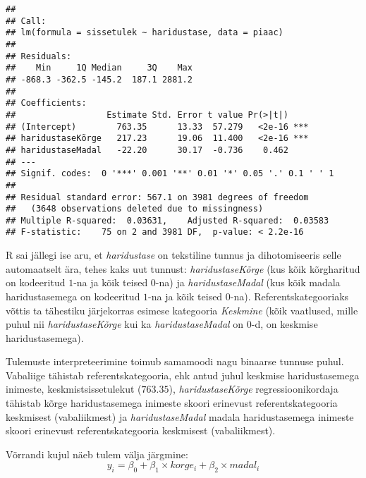 \documentclass[
]{book}
\begin{document}
\begin{verbatim}
## 
## Call:
## lm(formula = sissetulek ~ haridustase, data = piaac)
## 
## Residuals:
##    Min     1Q Median     3Q    Max 
## -868.3 -362.5 -145.2  187.1 2881.2 
## 
## Coefficients:
##                  Estimate Std. Error t value Pr(>|t|)    
## (Intercept)        763.35      13.33  57.279   <2e-16 ***
## haridustaseKõrge   217.23      19.06  11.400   <2e-16 ***
## haridustaseMadal   -22.20      30.17  -0.736    0.462    
## ---
## Signif. codes:  0 '***' 0.001 '**' 0.01 '*' 0.05 '.' 0.1 ' ' 1
## 
## Residual standard error: 567.1 on 3981 degrees of freedom
##   (3648 observations deleted due to missingness)
## Multiple R-squared:  0.03631,    Adjusted R-squared:  0.03583 
## F-statistic:    75 on 2 and 3981 DF,  p-value: < 2.2e-16
\end{verbatim}

R sai jällegi ise aru, et \emph{haridustase} on tekstiline tunnus ja dihotomiseeris selle automaatselt ära, tehes kaks uut tunnust: \emph{haridustaseKõrge} (kus kõik kõrgharitud on kodeeritud \(1\)-na ja kõik teised \(0\)-na) ja \emph{haridustaseMadal} (kus kõik madala haridustasemega on kodeeritud \(1\)-na ja kõik teised \(0\)-na). Referentskategooriaks võttis ta tähestiku järjekorras esimese kategooria \emph{Keskmine} (kõik vaatlused, mille puhul nii \emph{haridustaseKõrge} kui ka \emph{haridustaseMadal} on \(0\)-d, on keskmise haridustasemega).

Tulemuste interpreteerimine toimub samamoodi nagu binaarse tunnuse puhul. Vabaliige tähistab referentskategooria, ehk antud juhul keskmise haridustasemega inimeste, keskmistsissetulekut (\(763.35\)), \emph{haridustaseKõrge} regressioonikordaja tähistab kõrge haridustasemega inimeste skoori erinevust referentskategooria keskmisest (vabaliikmest) ja \emph{haridustaseMadal} madala haridustasemega inimeste skoori erinevust referentskategooria keskmisest (vabaliikmest).

Võrrandi kujul näeb tulem välja järgmine:
\[y_i=\beta_0+\beta_1 \times korge_i+\beta_2 \times madal_i\]
\end{document}
